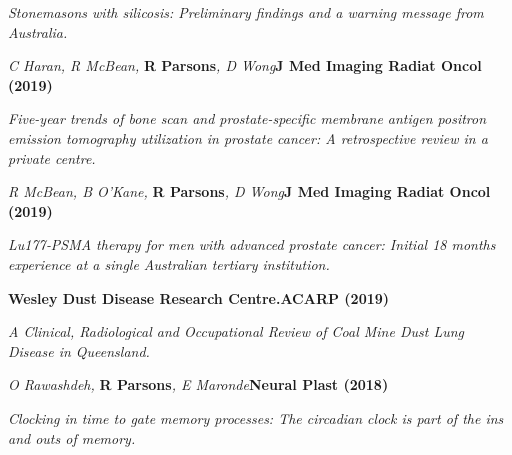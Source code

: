     \textit{Stonemasons with silicosis: Preliminary findings and a warning message from Australia.}
\item
    \textit{C Haran, R McBean, }\textbf{R Parsons}\textit{, D Wong}\textbf{\hfill J Med Imaging Radiat Oncol (2019)}\par 
    \textit{Five-year trends of bone scan and prostate-specific membrane antigen positron emission tomography utilization in prostate cancer: A retrospective review in a private centre.}
\item
    \textit{R McBean, B O'Kane, }\textbf{R Parsons}\textit{, D Wong}\textbf{\hfill J Med Imaging Radiat Oncol (2019)}\par 
    \textit{Lu177‐PSMA therapy for men with advanced prostate cancer: Initial 18 months experience at a single Australian tertiary institution.}
\item
    \textbf{Wesley Dust Disease Research Centre.}\textbf{\hfill ACARP (2019)}\par 
    \textit{A Clinical, Radiological and Occupational Review of Coal Mine Dust Lung Disease in Queensland.}
\item
    \textit{O Rawashdeh, }\textbf{R Parsons}\textit{, E Maronde}\textbf{\hfill Neural Plast (2018)}\par 
    \textit{Clocking in time to gate memory processes: The circadian clock is part of the ins and outs of memory.}
